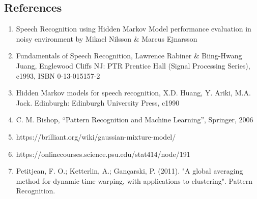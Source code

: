 \documentclass[12pt, a4paper, twoside]{report}
\begin{document}
\subsection*{References}
\begin{enumerate}
\item Speech Recognition using Hidden Markov Model performance evaluation in noisy environment by Mikael Nilsson \& Marcus Ejnarsson
\item Fundamentals of Speech Recognition, Lawrence Rabiner \& Biing-Hwang Juang, Englewood Cliffs NJ: PTR Prentice Hall (Signal Processing Series), c1993, ISBN 0-13-015157-2
\item Hidden Markov models for speech recognition, X.D. Huang, Y. Ariki, M.A. Jack. Edinburgh: Edinburgh University Press, c1990
\item C. M. Bishop, ``Pattern Recognition and Machine Learning'', Springer, 2006
\item https://brilliant.org/wiki/gaussian-mixture-model/
\item https://onlinecourses.science.psu.edu/stat414/node/191
\item Petitjean, F. O.; Ketterlin, A.; Gançarski, P. (2011). "A global averaging method for dynamic time warping, with applications to clustering". Pattern Recognition.
\end{enumerate}
\end{document}
